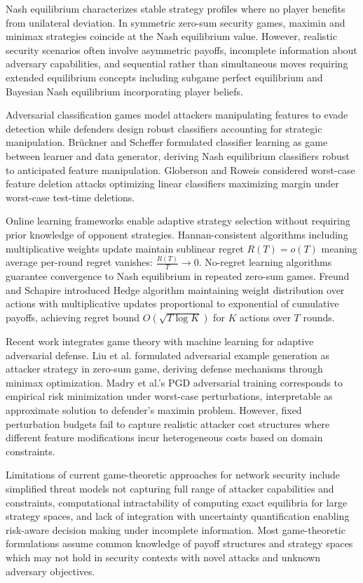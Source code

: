 Nash equilibrium characterizes stable strategy profiles where no player benefits from unilateral deviation. In symmetric zero-sum security games, maximin and minimax strategies coincide at the Nash equilibrium value. However, realistic security scenarios often involve asymmetric payoffs, incomplete information about adversary capabilities, and sequential rather than simultaneous moves requiring extended equilibrium concepts including subgame perfect equilibrium and Bayesian Nash equilibrium incorporating player beliefs.

Adversarial classification games model attackers manipulating features to evade detection while defenders design robust classifiers accounting for strategic manipulation. Brückner and Scheffer formulated classifier learning as game between learner and data generator, deriving Nash equilibrium classifiers robust to anticipated feature manipulation. Globerson and Roweis considered worst-case feature deletion attacks optimizing linear classifiers maximizing margin under worst-case test-time deletions.

Online learning frameworks enable adaptive strategy selection without requiring prior knowledge of opponent strategies. Hannan-consistent algorithms including multiplicative weights update maintain sublinear regret $R(T) = o(T)$ meaning average per-round regret vanishes: $\frac{R(T)}{T} \to 0$. No-regret learning algorithms guarantee convergence to Nash equilibrium in repeated zero-sum games. Freund and Schapire introduced Hedge algorithm maintaining weight distribution over actions with multiplicative updates proportional to exponential of cumulative payoffs, achieving regret bound $O(\sqrt{T \log K})$ for $K$ actions over $T$ rounds.

Recent work integrates game theory with machine learning for adaptive adversarial defense. Liu et al. formulated adversarial example generation as attacker strategy in zero-sum game, deriving defense mechanisms through minimax optimization. Madry et al.'s PGD adversarial training corresponds to empirical risk minimization under worst-case perturbations, interpretable as approximate solution to defender's maximin problem. However, fixed perturbation budgets fail to capture realistic attacker cost structures where different feature modifications incur heterogeneous costs based on domain constraints.

Limitations of current game-theoretic approaches for network security include simplified threat models not capturing full range of attacker capabilities and constraints, computational intractability of computing exact equilibria for large strategy spaces, and lack of integration with uncertainty quantification enabling risk-aware decision making under incomplete information. Most game-theoretic formulations assume common knowledge of payoff structures and strategy spaces which may not hold in security contexts with novel attacks and unknown adversary objectives.

